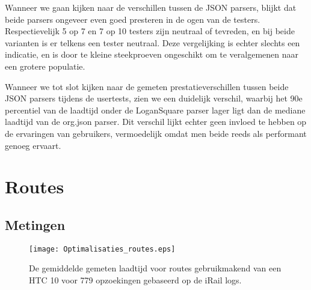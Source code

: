 Wanneer we gaan kijken naar de verschillen tussen de JSON parsers, blijkt dat beide parsers ongeveer even goed presteren in de ogen van de testers. Respectievelijk 5 op 7 en 7 op 10 testers zijn neutraal of tevreden, en bij beide varianten is er telkens een tester neutraal. Deze vergelijking is echter slechts een indicatie, en is door te kleine steekproeven ongeschikt om te veralgemenen naar een grotere populatie.

Wanneer we tot slot kijken naar de gemeten prestatieverschillen tussen beide JSON parsers tijdens de usertests, zien we een duidelijk verschil, waarbij het 90e percentiel van de laadtijd onder de LoganSquare parser lager ligt dan de mediane laadtijd van de org.json parser. Dit verschil lijkt echter geen invloed te hebben op de ervaringen van gebruikers, vermoedelijk omdat men beide reeds als performant genoeg ervaart.

\section{Routes}

\subsection{Metingen}
\begin{figure}[h]
	\centering
	\texttt{[image: Optimalisaties\_routes.eps]}
	\caption[Gemeten laadtijd routes]{De gemiddelde gemeten laadtijd voor routes gebruikmakend van een HTC 10 voor 779 opzoekingen gebaseerd op de iRail logs.}
	\label{fig:routelabtest}
\end{figure}
%		

